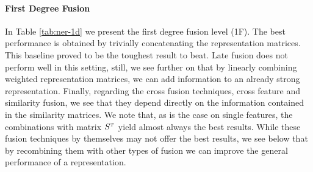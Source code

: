 \paragraph{First Degree Fusion }
In Table \ref{tab:ner-1d} we present the first degree fusion level (1F). The best performance is obtained by trivially concatenating the representation matrices. This baseline proved to be the toughest result to beat. Late fusion does not perform well in this setting, still, we see further on that by linearly combining weighted representation matrices, we can add information to an already strong representation. Finally, regarding the cross fusion techniques, cross feature and similarity fusion, we see that they depend directly on the information contained in the similarity matrices. We note that, as is the case on single features, the combinations with matrix $S^{\scriptscriptstyle T}$ yield almost always the best results. While these fusion techniques by themselves may not offer the best results, we see below that by recombining them with other types of fusion we can improve the general performance of a representation.





